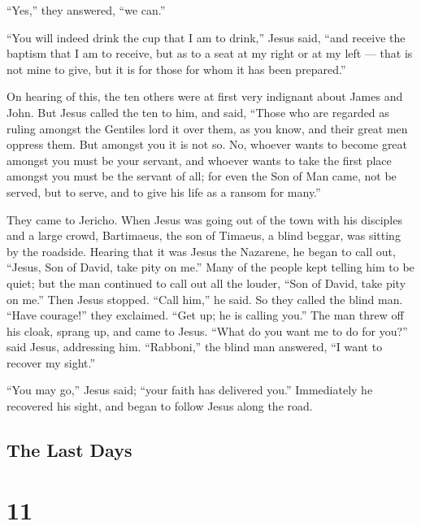  ``Yes,'' they answered, ``we can.''

``You will indeed drink the cup that I am to drink,'' Jesus said, ``and
receive the baptism that I am to receive,  but as to a seat
at my right or at my left --- that is not mine to give, but it is for
those for whom it has been prepared.''

 On hearing of this, the ten others were at first very
indignant about James and John.  But Jesus called the ten
to him, and said, ``Those who are regarded as ruling amongst the
Gentiles lord it over them, as you know, and their great men oppress
them.  But amongst you it is not so. No, whoever wants to
become great amongst you must be your servant,  and whoever
wants to take the first place amongst you must be the servant of all;
 for even the Son of Man came, not be served, but to serve,
and to give his life as a ransom for many.''

 They came to Jericho. When Jesus was going out of the town
with his disciples and a large crowd, Bartimaeus, the son of Timaeus, a
blind beggar, was sitting by the roadside.  Hearing that it
was Jesus the Nazarene, he began to call out, ``Jesus, Son of David,
take pity on me.''  Many of the people kept telling him to
be quiet; but the man continued to call out all the louder, ``Son of
David, take pity on me.''  Then Jesus stopped. ``Call
him,'' he said. So they called the blind man. ``Have courage!'' they
exclaimed. ``Get up; he is calling you.''  The man threw
off his cloak, sprang up, and came to Jesus.  ``What do you
want me to do for you?'' said Jesus, addressing him. ``Rabboni,'' the
blind man answered, ``I want to recover my sight.''

 ``You may go,'' Jesus said; ``your faith has delivered
you.'' Immediately he recovered his sight, and began to follow Jesus
along the road.

\hypertarget{the-last-days}{%
\subsection{The Last Days}\label{the-last-days}}

\hypertarget{section-10}{%
\section{11}\label{section-10}}

